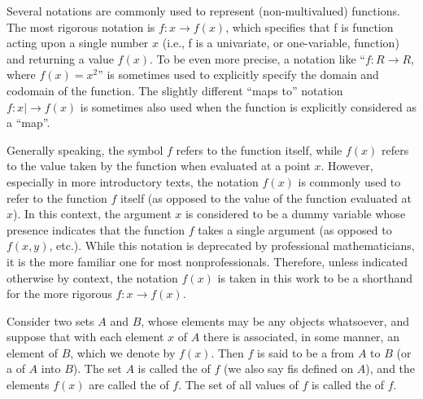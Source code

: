 {Several notations are commonly used to represent (non-multivalued) functions. 
The most rigorous notation is $f:x\rightarrow f(x)$, which specifies that f is function acting upon a single number $x$ (i.e., f is a univariate, or one-variable, function) and returning a value $f(x)$. 
To be even more precise, a notation like ``$f:R\rightarrow R$, where $f(x)=x^2$''
 is sometimes used to explicitly specify the domain and codomain of the function. 
The slightly different 
``maps to''
 notation $f:x|\rightarrow f(x)$ is sometimes also used when the function is explicitly considered as a 
``map''.


Generally speaking, the symbol $f$ refers to the function itself, while $f(x)$ refers to the value taken by the function when evaluated at a point $x$. 
However, especially in more introductory texts, the notation $f(x)$ is commonly used to refer to the function $f$ itself (as opposed to the value of the function evaluated at $x$). 
In this context, the argument $x$ is considered to be a dummy variable whose presence indicates that the function $f$ takes a single argument (as opposed to $f(x,y)$, etc.). 
While this notation is deprecated by professional mathematicians, it is the more familiar one for most nonprofessionals. 
Therefore, unless indicated otherwise by context, the notation $f(x)$ is taken in this work to be a shorthand for the more rigorous $f:x\rightarrow f(x)$.
}

\begin{mydef}
    \label{mydef:2.1}
    Consider two sets $A$ and $B$, whose elements may be any objects whatsoever, and suppose that with each element $x$ of $A$ there is associated, in some manner, an element of $B$, which we denote by $f(x)$. Then $f$ is said to be a  from $A$ to $B$ (or a  of $A$ into $B$). The set $A$ is called the  of $f$ (we also say fis defined on $A$), and the elements $f(x)$ are called the  of $f$. The set of all values of $f$ is called the  of $f$.
\end{mydef}

